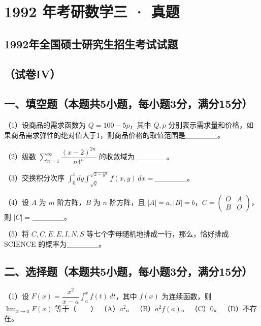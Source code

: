 \documentclass[UTF8,12pt]{ctexart}
\begin{document}
\section*{1992 年考研数学三 · 真题}
\subsection*{1992年全国硕士研究生招生考试试题}

\subsection*{（试卷IV）}

\subsection*{一、填空题（本题共5小题，每小题3分，满分15分）}

（1）设商品的需求函数为 \(\displaystyle Q=100-5p\)，其中 \(\displaystyle Q,\allowbreak p\) 分别表示需求量和价格，如果商品需求弹性的绝对值大于1，则商品价格的取值范围是\_\_\_\_\_\_。


（2）级数 \(\displaystyle \sum_{n=1}^{\infty}\dfrac{\displaystyle (x-2)^{2n}}{\displaystyle n4^n}\) 的收敛域为\_\_\_\_\_\_。


（3）交换积分次序 \(\displaystyle \int_0^1dy\displaystyle \int_{\sqrt y}^{\sqrt{2-y^2}}f(x,\allowbreak y)\,dx=\)\_\_\_\_\_\_。


（4）设 \(\displaystyle A\) 为 \(\displaystyle m\) 阶方阵，\(\displaystyle B\) 为 \(\displaystyle n\) 阶方阵，且 \(\displaystyle |A|=a,\allowbreak |B|=b\)，\(\displaystyle C=\begin{pmatrix}O&A\\B&O\end{pmatrix}\)，则 \(\displaystyle |C|=\)\_\_\_\_\_\_。


（5）将 \(\displaystyle C,\allowbreak C,\allowbreak E,\allowbreak E,\allowbreak I,\allowbreak N,\allowbreak S\) 等七个字母随机地排成一行，那么，恰好排成 SCIENCE 的概率为\_\_\_\_\_\_。


\subsection*{二、选择题（本题共5小题，每小题3分，满分15分）}

（1）设 \(\displaystyle F(x)=\dfrac{\displaystyle x^2}{\displaystyle x-a}\displaystyle \int_a^x f(t)\,dt\)，其中 \(\displaystyle f(x)\) 为连续函数，则 \(\displaystyle \lim_{x\to a}F(x)\) 等于（　　） （A）\(\displaystyle a^2\)。 （B）\(\displaystyle a^2f(a)\)。 （C）\(\displaystyle 0\)。 （D）不存在。
\end{document}
